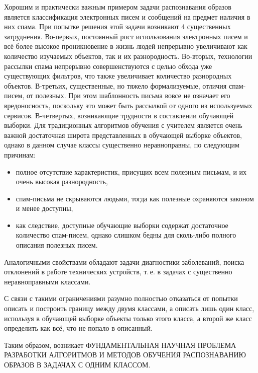 \documentclass[12pt,a4paper]{article}
\begin{document}
	Хорошим и практически важным примером задачи распознавания образов является классификация электронных писем и сообщений на предмет наличия в них спама. 
	При попытке решения этой задачи возникают 4 существенных затруднения. 
	Во-первых, постоянный рост использования электронных писем и всё более высокое проникновение в жизнь людей непрерывно увеличивают как количество изучаемых объектов, так и их разнородность.
	Во-вторых, технологии рассылки спама непрерывно совершенствуются с целью обхода уже существующих фильтров, что также увеличивает количество разнородных объектов.
	В-третьих, существенные, но тяжело формализуемые, отличия спам-писем, от полезных. 
	При этом шаблонность письма вовсе не означает его вредоносность, поскольку это может быть рассылкой от одного из используемых сервисов. 
	В-четвертых, возникающие трудности в составлении обучающей выборки. Для традиционных алгоритмов обучения с учителем является очень важной достаточная широта представленных в обучающей выборке объектов, однако в данном случае классы существенно неравноправны, по следующим причинам:
	\begin{itemize}
	 	\item полное отсутствие характеристик, присущих всем полезным письмам, и их очень высокая разнородность,
	 	\item спам-письма не скрываются людьми, тогда как полезные охраняются законом и менее доступны,
	 	\item как следствие, доступные обучающие выборки содержат достаточное количество спам-писем, однако слишком бедны для сколь-либо полного описания полезных писем.
	\end{itemize}

	Аналогичными свойствами обладают задачи диагностики заболеваний, поиска отклонений в работе технических устройств, т.\,е. в задачах с существенно неравноправными классами.
	
	С связи с такими ограничениями разумно полностью отказаться от попытки описать и построить границу между двумя классами, а описать лишь один класс, используя в обучающей выборке объекты только этого класса, а второй же класс определить как всё, что не попало в описанный.

	Таким образом, возникает \MakeTextUppercase{фундаментальная научная проблема разработки алгоритмов и методов обучения распознаванию образов в задачах с одним классом.}
\end{document}
